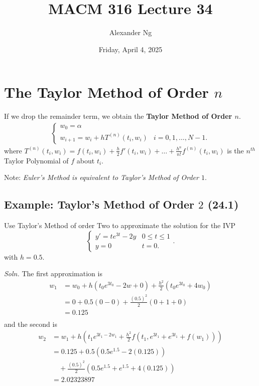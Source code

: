 \documentclass[12pt]{article}
\newcommand{\soln}{\textit{Soln.}\xspace}
\begin{document}
\title{MACM 316 Lecture 34}
\author{Alexander Ng}
\date{Friday, April 4, 2025}

\maketitle

\section{The Taylor Method of Order $n$}
If we drop the remainder term, we obtain the \textbf{Taylor Method of Order $n$}.
\begin{align*}
  \begin{cases}
    w_0 = \alpha & \\
    w_{i+1} = w_i + hT^{(n)}(t_i, w_i) & i = 0, 1, \dots, N-1
  .\end{cases}
\end{align*}
where $T^{(n)}(t_i, w_i) = f(t_i, w_i) + \frac{h}{2}f'(t_i, w_i) + \dots + 
\frac{h^n}{n!}f^{(n)}(t_i, w_i)$ is the $n^{th}$ Taylor Polynomial of $f$ about
$t_i$.

Note: \textit{Euler's Method is equivalent to Taylor's Method of Order $1$}.

\subsection{Example: Taylor's Method of Order $2$ (24.1)}
Use Taylor's Method of order Two to approximate the solution for the IVP 
\[
  \begin{cases}
    y' = te^{3t} - 2y & 0 \leq t \leq 1\\
    y = 0 & t = 0
  .\end{cases}
.\]
with $h=0.5$.

\soln The first approximation is 
\begin{align*}
  w_1 &= w_0 + h(t_0e^{3t_0}-2w+0) + \frac{h^2}{2}(t_0 e^{3t_0} + 4w_0) \\
      &= 0 + 0.5(0-0) + \frac{(0.5)^2}{2}(0+1+0) \\ 
      &= 0.125 \\
\end{align*}
and the second is 
\begin{align*}
  w_2 &= w_1 + h \left( t_1 e^{3t_1 - 2w_1} + \frac{h^2}{2} f\left(t_1, e^{3t_1} + e^{3t_1} + f(w_1)\right) \right) \\
      &= 0.125 + 0.5 \left( 0.5 e^{1.5} - 2(0.125) \right) \\
      &\quad + \frac{(0.5)^2}{2} \left( 0.5 e^{1.5} + e^{1.5} + 4(0.125) \right) \\
      &= 2.02323897
\end{align*}
\end{document}
